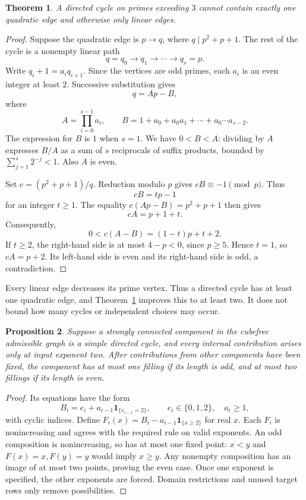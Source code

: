 \documentclass[11pt]{article}
\newtheorem{theorem}{Theorem}[section]
\newtheorem{proposition}[theorem]{Proposition}
\begin{document}
\begin{theorem}\label{thm:onequad}
A directed cycle on primes exceeding $3$ cannot contain exactly one quadratic edge and otherwise only linear edges.
\end{theorem}
\begin{proof}
Suppose the quadratic edge is $p\to q$, where $q\mid p^2+p+1$. The rest of the cycle is a nonempty linear path
\[
 q=q_0\longrightarrow q_1\longrightarrow\cdots\longrightarrow q_s=p.
\]
Write $q_i+1=a_iq_{i+1}$. Since the vertices are odd primes, each $a_i$ is an even integer at least $2$. Successive substitution gives
\[
 q=Ap-B,
\]
where
\[
 A=\prod_{i=0}^{s-1}a_i,\qquad
 B=1+a_0+a_0a_1+\cdots+a_0\cdots a_{s-2}.
\]
The expression for $B$ is $1$ when $s=1$. We have $0<B<A$: dividing by $A$ expresses $B/A$ as a sum of $s$ reciprocals of suffix products, bounded by $\sum_{j=1}^s2^{-j}<1$. Also $A$ is even.

Set $c=(p^2+p+1)/q$. Reduction modulo $p$ gives $cB\equiv-1\pmod p$. Thus
\[
 cB=tp-1
\]
for an integer $t\ge1$. The equality $c(Ap-B)=p^2+p+1$ then gives
\[
 cA=p+1+t.
\]
Consequently,
\[
 0<c(A-B)=(1-t)p+t+2.
\]
If $t\ge2$, the right-hand side is at most $4-p<0$, since $p\ge5$. Hence $t=1$, so $cA=p+2$. Its left-hand side is even and its right-hand side is odd, a contradiction.
\end{proof}

Every linear edge decreases its prime vertex. Thus a directed cycle has at least one quadratic edge, and Theorem~\ref{thm:onequad} improves this to at least two. It does not bound how many cycles or independent choices may occur.

\begin{proposition}\label{prop:oddcycle}
Suppose a strongly connected component in the cubefree admissible graph is a simple directed cycle, and every internal contribution arises only at input exponent two. After contributions from other components have been fixed, the component has at most one filling if its length is odd, and at most two fillings if its length is even.
\end{proposition}
\begin{proof}
Its equations have the form
\[
 B_i=e_i+a_{i-1}\mathbf1_{\{e_{i-1}=2\}},\qquad e_i\in\{0,1,2\},\quad a_i\ge1,
\]
with cyclic indices. Define $F_i(x)=B_i-a_{i-1}\mathbf1_{\{x\ge2\}}$ for real $x$. Each $F_i$ is nonincreasing and agrees with the required rule on valid exponents. An odd composition is nonincreasing, so has at most one fixed point: $x<y$ and $F(x)=x,F(y)=y$ would imply $x\ge y$. Any nonempty composition has an image of at most two points, proving the even case. Once one exponent is specified, the other exponents are forced. Domain restrictions and unused target rows only remove possibilities.
\end{proof}
\end{document}
